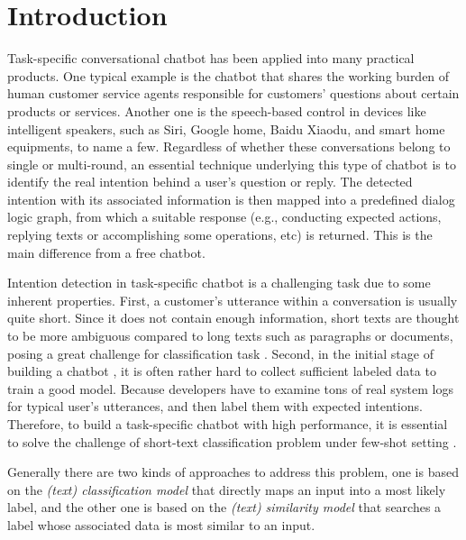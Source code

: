\section{Introduction}
\label{sec:intro}

Task-specific  conversational  chatbot  \cite{wen2016network}  has been applied
into  many practical products. One typical example is the chatbot that shares the working burden of
human  customer  service  agents  responsible  for  customers' questions about
certain  products  or services. Another one is the speech-based control in
devices  like  intelligent  speakers, such as Siri, Google home, Baidu Xiaodu,
and smart home equipments, to name a few. Regardless of whether these conversations belong to
single or  multi-round, an essential technique underlying this type of chatbot is to
identify  the  real  intention  behind  a  user's  question or reply. 
The detected intention  with  its  associated  information  is then mapped into a
predefined dialog logic graph, from which a suitable response (e.g., conducting 
expected actions, replying texts or accomplishing some operations, etc)  is returned.
This  is  the  main  difference  from  a  free chatbot.  

Intention detection in task-specific chatbot  is  a  challenging task due to some inherent properties. First,
a customer's  utterance  within  a conversation is usually quite short. Since it
does  not  contain  enough  information,  short  texts \cite{song2014short} are
thought  to  be  more  ambiguous  compared to long texts such as paragraphs or
documents,  posing  a  great challenge \cite{chen2019deep} for classification
task   \cite{phan2008learning,yan2009dynamic,hua2015short}.   Second,  in  the
initial  stage  of  building  a  chatbot  , it is often rather hard to collect
sufficient  labeled  data  to  train  a good model. Because developers have to
examine tons of real system logs for typical user's utterances, and then label
them  with expected intentions. Therefore, to build a task-specific chatbot with
high  performance, it is essential to solve the challenge of short-text
classification   \cite{sriram2010short}   problem   under   few-shot   setting
\cite{yu2018diverse}.


Generally  there  are  two  kinds  of  approaches  to  address  this  problem,
one is based on the \emph{(text) classification model} that directly maps an input into a most likely label, and
the other one is based on the \emph{(text) similarity  model}  that searches a label whose associated data is most similar to
an input.


